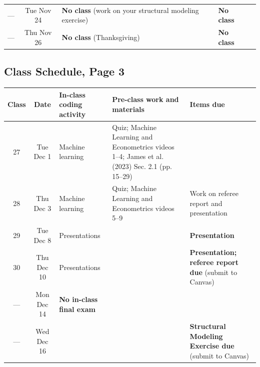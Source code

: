 \documentclass[11pt,english]{article}
\begin{document}
\begin{landscape}
\begin{center}
\begin{tabular}{cc>{\raggedright}m{5.5cm}>{\raggedright}m{7.5cm}>{\raggedright}m{3.5cm}}
--- & Tue Nov 24 & \textbf{No class} (work on your structural modeling exercise)  & \textbf{No class}                                                                                            &  \tabularnewline
--- & Thu Nov 26 & \textbf{No class} (Thanksgiving)                               & \textbf{No class}                                                                                            &  \tabularnewline
\bottomrule
\end{tabular}
\par\end{center}
\end{landscape}

\begin{landscape}
\section*{Class Schedule, Page 3}
\begin{center}
\begin{tabular}{cc>{\raggedright}m{5.5cm}>{\raggedright}m{7.5cm}>{\raggedright}m{3.5cm}}
\toprule
\textbf{Class} & \textbf{Date} & \textbf{In-class coding activity} & \textbf{Pre-class work and materials} & \textbf{Items due} \tabularnewline \midrule
27  & Tue Dec 1  & Machine learning               & Quiz; Machine Learning and Econometrics videos 1--4; James et al. (2023) Sec. 2.1 (pp. 15--29) &  \tabularnewline
28  & Thu Dec 3  & Machine learning               & Quiz; Machine Learning and Econometrics videos 5--9                                           & Work on referee report and presentation \tabularnewline
29  & Tue Dec 8  & Presentations                  &                                                                                               & \textbf{Presentation} \tabularnewline
30  & Thu Dec 10 & Presentations                  &                                                                                               & \textbf{Presentation; referee report due} (submit to Canvas) \tabularnewline
--- & Mon Dec 14 & \textbf{No in-class final exam} &                                                                                              &  \tabularnewline
--- & Wed Dec 16 &                                &                                                                                               & \textbf{Structural Modeling Exercise due} (submit to Canvas) \tabularnewline
\bottomrule
\end{tabular}
\par\end{center}
\end{landscape}
\end{document}
